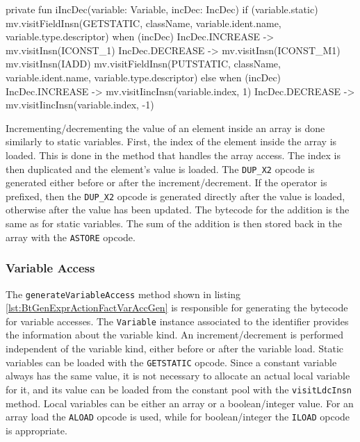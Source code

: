 \begin{KotlinCode}[float,numbers=none,caption=Implementation of the \texttt{iIncDec} method of the \texttt{ActionFactGenerator}., label=lst:BtGenExprActionFactIncDecGen]
private fun iIncDec(variable: Variable, incDec: IncDec) {
    if (variable.static) {
        mv.visitFieldInsn(GETSTATIC, className, variable.ident.name, variable.type.descriptor)
        when (incDec) {
            IncDec.INCREASE -> mv.visitInsn(ICONST_1)
            IncDec.DECREASE -> mv.visitInsn(ICONST_M1)
        }
        mv.visitInsn(IADD)
        mv.visitFieldInsn(PUTSTATIC, className, variable.ident.name, variable.type.descriptor)
    } else {
        when (incDec) {
            IncDec.INCREASE -> mv.visitIincInsn(variable.index, 1)
            IncDec.DECREASE -> mv.visitIincInsn(variable.index, -1)
        }
    }
}
\end{KotlinCode}

Incrementing/decrementing the value of an element inside an array is done similarly to static variables. First, the index of the element inside the array is loaded. This is done in the method that handles the array access. The index is then duplicated and the element's value is loaded. The \verb|DUP_X2| opcode is generated either before or after the increment/decrement. If the operator is prefixed, then the \verb|DUP_X2| opcode is generated directly after the value is loaded, otherwise after the value has been updated. The bytecode for the addition is the same as for static variables. The sum of the addition is then stored back in the array with the \verb|ASTORE| opcode. 

\subsubsection{Variable Access}

The \verb|generateVariableAccess| method shown in listing \ref{lst:BtGenExprActionFactVarAccGen} is responsible for generating the bytecode for variable accesses. The \verb|Variable| instance associated to the identifier provides the information about the variable kind. An increment/decrement is performed independent of the variable kind, either before or after the variable load. Static variables can be loaded with the \verb|GETSTATIC| opcode. Since a constant variable always has the same value, it is not necessary to allocate an actual local variable for it, and its value can be loaded from the constant pool with the \verb|visitLdcInsn| method. Local variables can be either an array or a boolean/integer value. For an array load the \verb|ALOAD| opcode is used, while for boolean/integer the \verb|ILOAD| opcode is appropriate. 


